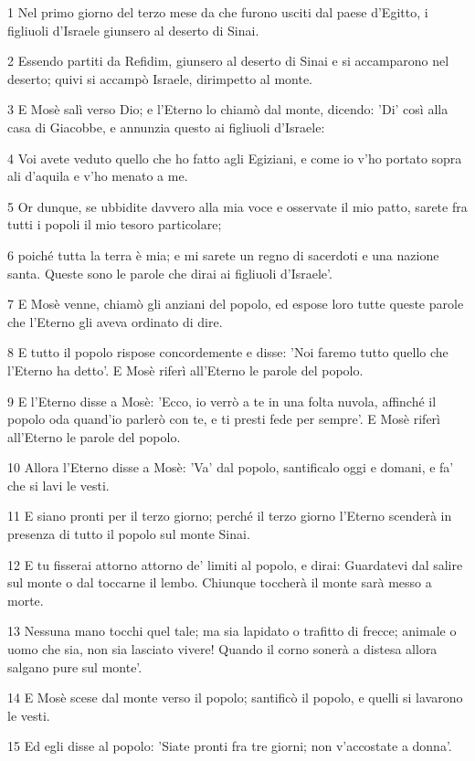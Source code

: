 \par 1 Nel primo giorno del terzo mese da che furono usciti dal paese d'Egitto, i figliuoli d'Israele giunsero al deserto di Sinai.
\par 2 Essendo partiti da Refidim, giunsero al deserto di Sinai e si accamparono nel deserto; quivi si accampò Israele, dirimpetto al monte.
\par 3 E Mosè salì verso Dio; e l'Eterno lo chiamò dal monte, dicendo: 'Di' così alla casa di Giacobbe, e annunzia questo ai figliuoli d'Israele:
\par 4 Voi avete veduto quello che ho fatto agli Egiziani, e come io v'ho portato sopra ali d'aquila e v'ho menato a me.
\par 5 Or dunque, se ubbidite davvero alla mia voce e osservate il mio patto, sarete fra tutti i popoli il mio tesoro particolare;
\par 6 poiché tutta la terra è mia; e mi sarete un regno di sacerdoti e una nazione santa. Queste sono le parole che dirai ai figliuoli d'Israele'.
\par 7 E Mosè venne, chiamò gli anziani del popolo, ed espose loro tutte queste parole che l'Eterno gli aveva ordinato di dire.
\par 8 E tutto il popolo rispose concordemente e disse: 'Noi faremo tutto quello che l'Eterno ha detto'. E Mosè riferì all'Eterno le parole del popolo.
\par 9 E l'Eterno disse a Mosè: 'Ecco, io verrò a te in una folta nuvola, affinché il popolo oda quand'io parlerò con te, e ti presti fede per sempre'. E Mosè riferì all'Eterno le parole del popolo.
\par 10 Allora l'Eterno disse a Mosè: 'Va' dal popolo, santificalo oggi e domani, e fa' che si lavi le vesti.
\par 11 E siano pronti per il terzo giorno; perché il terzo giorno l'Eterno scenderà in presenza di tutto il popolo sul monte Sinai.
\par 12 E tu fisserai attorno attorno de' limiti al popolo, e dirai: Guardatevi dal salire sul monte o dal toccarne il lembo. Chiunque toccherà il monte sarà messo a morte.
\par 13 Nessuna mano tocchi quel tale; ma sia lapidato o trafitto di frecce; animale o uomo che sia, non sia lasciato vivere! Quando il corno sonerà a distesa allora salgano pure sul monte'.
\par 14 E Mosè scese dal monte verso il popolo; santificò il popolo, e quelli si lavarono le vesti.
\par 15 Ed egli disse al popolo: 'Siate pronti fra tre giorni; non v'accostate a donna'.
